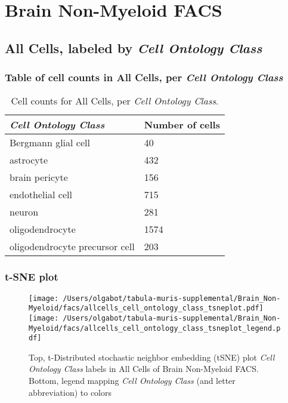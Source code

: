 \clearpage
\section{Brain Non-Myeloid FACS}

\subsection{All Cells, labeled by \emph{Cell Ontology Class}}
\subsubsection{Table of cell counts in All Cells, per \emph{Cell Ontology Class}}\begin{table}[h]
\centering
\label{my-label}
\begin{tabular}{@{}ll@{}}
\toprule

\emph{Cell Ontology Class}& Number of cells \\ \midrule
Bergmann glial cell & 40 \\

astrocyte & 432 \\

brain pericyte & 156 \\

endothelial cell & 715 \\

neuron & 281 \\

oligodendrocyte & 1574 \\

oligodendrocyte precursor cell & 203 \\
\bottomrule
\end{tabular}
\caption{Cell counts for All Cells, per \emph{Cell Ontology Class}.}
\end{table}

\clearpage
\subsubsection{t-SNE plot}
\begin{figure}[h]
\centering
\texttt{[image: /Users/olgabot/tabula-muris-supplemental/Brain\_Non-Myeloid/facs/allcells\_cell\_ontology\_class\_tsneplot.pdf]}
\texttt{[image: /Users/olgabot/tabula-muris-supplemental/Brain\_Non-Myeloid/facs/allcells\_cell\_ontology\_class\_tsneplot\_legend.pdf]}
\caption{Top, t-Distributed stochastic neighbor embedding (tSNE) plot  \emph{Cell Ontology Class} labels in All Cells of Brain Non-Myeloid FACS. Bottom, legend mapping \emph{Cell Ontology Class} (and letter abbreviation) to colors}
\end{figure}


